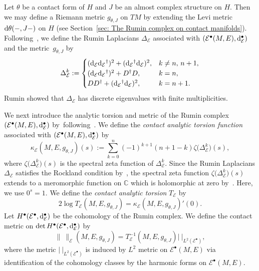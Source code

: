 \documentclass[pdftex]{sigma}
\numberwithin{equation}{section}
\newcommand{\adjoint}{\dagger}
\newcommand{\RN}{\cE}
\newcommand{\cE}{\mathcal{E}}
\begin{document}
Let $\theta$ be a contact form of $H$
and
$J$ be an almost complex structure on $H$.
Then we may define a Riemann metric $g_{\theta , J}$ on $TM$ by extending the Levi metric ${\rm d} \theta (- ,J-)$ on $H$
(see Section~\ref{sec: The Rumin complex on contact manifolds}).
Following~\cite{Rumin-94}, we define the Rumin Laplacians $\Delta_\RN $ associated with $(\cE ^\bullet (M,E) , {\rm d}_\RN ^\bullet)$ and the metric~$g_{\theta , J}$ by
\[
 \Delta_\RN ^k
 :=
 \begin{cases}
 ( {\rm d}_\RN {\rm d}_\RN {}^{\adjoint })^2
 + ({\rm d}_\RN {}^{\adjoint } {\rm d}_\RN )^2 , & k \not = n, \, n+1 , \\
 ( {\rm d}_\RN {\rm d}_\RN {}^{\adjoint })^2
 + D^{\adjoint } D , & k=n, \\
 D D^{\adjoint }
 + ({\rm d}_\RN {}^{\adjoint } {\rm d}_\RN )^2 , & k =n+1.
 \end{cases}
\]
Rumin showed that $\Delta_\RN $ has discrete eigenvalues with finite multiplicities.

We next introduce the analytic torsion and metric of the Rumin complex $(\cE ^\bullet (M,E) , {\rm d}_\RN ^\bullet)$ by~following~\cite{Bismut-Zhang-92, Kitaoka-19, Rumin-Seshadri-12}.
We define the {\em contact analytic torsion function} associated with $(\cE ^\bullet (M,E),\allowbreak {\rm d}_\RN ^\bullet)$ by
\begin{equation}
 \label{kappa}
 \kappa_\RN ( M, E, g_{\theta , J}) (s)
 := \sum_{k=0}^{n} (-1)^{k+1} (n+1-k) \zeta \big(\Delta_\RN ^k \big) (s)
 ,
\end{equation}
where $\zeta \big(\Delta_\RN ^k \big) (s)$ is the spectral zeta function of $\Delta_\RN ^k$.
Since the Rumin Laplacians $\Delta_\RN $ satisfies the Rockland condition by~\cite[p.~300]{Rumin-94},
the spectral zeta function $\zeta \big(\Delta_\RN ^k \big) (s)$ extends to a meromorphic function
on $\mathbb{C}$ which is holomorphic at zero by~\cite[Section~4]{Ponge-07}.
Here, we use $0^s = 1$.
We define the {\em contact analytic torsion} $ T_\RN $ by
\[
 2 \log T_\RN ( M , E, g_{\theta , J})
 =
 \kappa_\RN ( M , E, g_{\theta , J}) ' (0) .
\]
Let $H^\bullet (\cE ^\bullet , {\rm d}_\RN ^\bullet)$ be the cohomology of the Rumin complex.
We define the contact metric on $\det H^\bullet (\cE ^\bullet , {\rm d}_\RN ^\bullet)$ by
\[
 \| \ \|_\RN (M, E, g_{\theta , J} )
 =
 T_\RN^{-1} ( M , E, g_{\theta , J})
 | \ |_{L^2 (\cE ^\bullet) },
\]
where
the metric
$| \ |_{L^2 (\cE ^\bullet) }$ is induced by $L^2$ metric on $\cE ^\bullet (M, E)$
via identification of the cohomology classes by the harmonic forms on $\cE ^\bullet (M, E)$.
\end{document}
